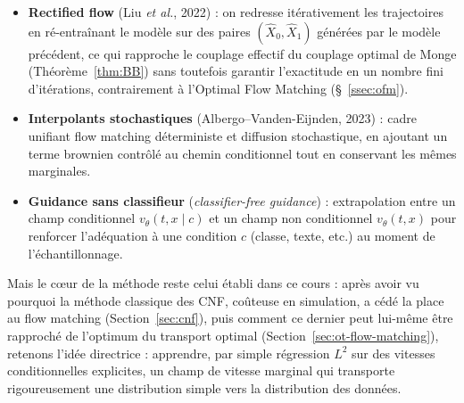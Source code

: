 \documentclass[11pt,a4paper]{article}
\theoremstyle{definition}
\theoremstyle{plain}
\theoremstyle{remark}
\begin{document}
\begin{itemize}[leftmargin=*]
  \item \textbf{Rectified flow} (Liu \emph{et al.}, 2022) : on \og redresse \fg{}
  itérativement les trajectoires en ré-entraînant le modèle sur des paires
  $(\widehat X_0,\widehat X_1)$ générées par le modèle précédent, ce qui
  rapproche le couplage effectif du couplage optimal de Monge
  (Théorème~\ref{thm:BB}) sans toutefois garantir l'exactitude en un nombre fini
  d'itérations, contrairement à l'Optimal Flow Matching (\S~\ref{ssec:ofm}).
  \item \textbf{Interpolants stochastiques} (Albergo--Vanden-Eijnden, 2023) :
  cadre unifiant flow matching déterministe et diffusion stochastique, en
  ajoutant un terme brownien contrôlé au chemin conditionnel tout en conservant
  les mêmes marginales.
  \item \textbf{Guidance sans classifieur} (\emph{classifier-free guidance}) :
  extrapolation entre un champ conditionnel $v_\theta(t,x\mid c)$ et un champ non
  conditionnel $v_\theta(t,x)$ pour renforcer l'adéquation à une condition $c$
  (classe, texte, etc.) au moment de l'échantillonnage.
\end{itemize}

Mais le cœur de la méthode reste celui établi dans ce cours : après avoir vu
pourquoi la méthode classique des CNF, coûteuse en simulation, a cédé la place
au flow matching (Section~\ref{sec:cnf}), puis comment ce dernier peut lui-même
être rapproché de l'optimum du transport optimal (Section~\ref{sec:ot-flow-matching}),
retenons l'idée directrice : apprendre, par simple régression $L^2$ sur des
vitesses conditionnelles explicites, un champ de vitesse marginal qui transporte
rigoureusement une distribution simple vers la distribution des données.
\end{document}
